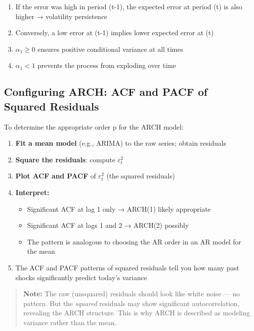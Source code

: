 \documentclass[12pt,openany]{book}
\theoremstyle{definition}
\theoremstyle{remark}
\begin{document}
\begin{enumerate}
\item If the error was high in period (t-1), the expected error at period (t) is also higher → volatility persistence


\item Conversely, a low error at (t-1) implies lower expected error at (t)


\item $\alpha_1 \geq 0$ ensures positive conditional variance at all times


\item $\alpha_1 < 1$ prevents the process from exploding over time


\end{enumerate}
\medskip
\subsection{Configuring ARCH: ACF and PACF of Squared Residuals}
To determine the appropriate order p for the ARCH model:

\begin{enumerate}
\item \textbf{Fit a mean model} (e.g., ARIMA) to the raw series; obtain residuals


\item \textbf{Square the residuals}: compute $\varepsilon^2_t$


\item \textbf{Plot ACF and PACF} of $\varepsilon^2_t$ (the squared residuals)


\item \textbf{Interpret:}

\begin{itemize}
\item Significant ACF at lag 1 only → ARCH(1) likely appropriate


\item Significant ACF at lags 1 and 2 → ARCH(2) possibly


\item The pattern is analogous to choosing the AR order in an AR model for the mean


\end{itemize}

\item The ACF and PACF patterns of squared residuals tell you how many past shocks significantly predict today's variance


\end{enumerate}
\begin{quote}
\textbf{Note:} The raw (unsquared) residuals should look like white noise --- no pattern. But the \emph{squared} residuals may show significant autocorrelation, revealing the ARCH structure. This is why ARCH is described as modeling variance rather than the mean.

\end{quote}
\medskip
\end{document}
